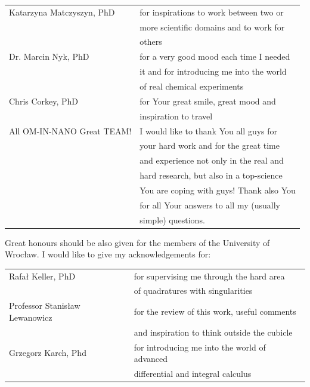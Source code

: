 \documentclass[12pt,twoside,a4paper]{article}
\numberwithin{equation}{subsection}
\numberwithin{figure}{subsection}
\begin{document}
\begin{tabular}{l l}
	Katarzyna Matczyszyn, PhD  & for inspirations to work between two or \\
	                           & more scientific domains and to work for \\ 
	                           & others \\ 
	Dr. Marcin Nyk, PhD        & for a very good mood each time I needed \\
	                           & it and for introducing me into the world \\
	                           & of real chemical experiments \\
	Chris Corkey, PhD          & for Your great smile, great mood and \\
	                           & inspiration to travel \\
	All OM-IN-NANO Great TEAM! & I would like to thank You all guys for \\ 
	                           & your hard work and for the great time \\
	                           & and experience not only in the real and \\
	                           & hard research, but also in a top-science \\
	                           & You are coping with guys! Thank also You \\
	                           & for all Your answers to all my (usually \\
	                           & simple) questions. \\
\end{tabular}


Great honours should be also given for the members of the University of Wrocław. I would like to give my acknowledgements for:


\begin{tabular}{l l}
    Rafał Keller, PhD              & for supervising me through the hard area \\
                                   & of quadratures with singularities \\ 
    Professor Stanisław Lewanowicz & for the review of this work, useful comments \\
    							   & and inspiration to think outside the cubicle \\
    Grzegorz Karch, Phd            & for introducing me into the world of advanced \\
                                   & differential and integral calculus \\
\end{tabular}
\end{document}
